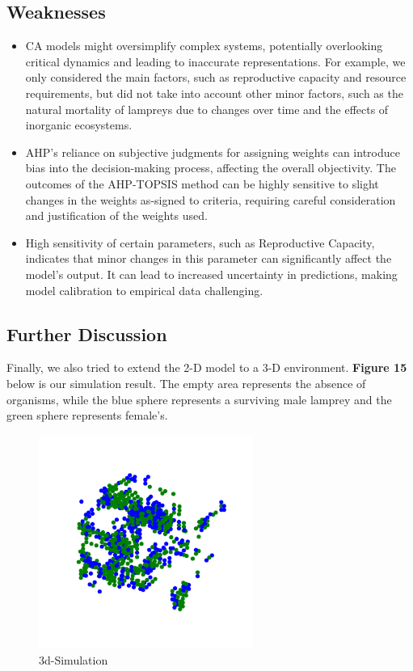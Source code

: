 \documentclass{mcmthesis}
\begin{document}
\subsection{Weaknesses}
\begin{itemize}
    \item CA models might oversimplify complex systems, potentially overlooking critical dynamics and leading to inaccurate representations. For example, we only considered the main factors, such as reproductive capacity and resource requirements, but did not take into account other minor factors, such as the natural mortality of lampreys due to changes over time and the effects of inorganic ecosystems.
    \item AHP's reliance on subjective judgments for assigning weights can introduce bias into the decision-making process, affecting the overall objectivity. The outcomes of the AHP-TOPSIS method can be highly sensitive to slight changes in the weights as-signed to criteria, requiring careful consideration and justification of the weights used.
    \item High sensitivity of certain parameters, such as Reproductive Capacity, indicates that minor changes in this parameter can significantly affect the model's output. It can lead to increased uncertainty in predictions, making model calibration to empirical data challenging.
\end{itemize}

\subsection{Further Discussion}
Finally, we also tried to extend the 2-D model to a 3-D environment. \textbf{Figure 15} below is our simulation result. The empty area represents the absence of organisms, while the blue sphere represents a surviving male lamprey and the green sphere represents female's.

\begin{figure}[H]  %
\small
\centering  %
\includegraphics[width=7cm]{figures/3dsimulation.png}  %
\caption{3d-Simulation} \label{fig:Lamprey}  %
\end{figure}  %
\end{document}
